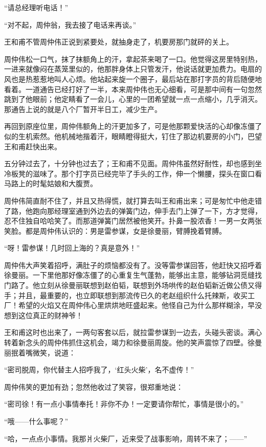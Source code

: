 \par “请总经理听电话！”
\par “对不起，周仲翁，我去接了电话来再谈。”
\par 王和甫不管周仲伟正说到紧要处，就抽身走了，机要房那门就砰的关上。
\par 周仲伟松一口气，抹了抹额角上的汗，拿起茶来喝了一口。他觉得这房里特别热，一进来就像闷在蒸笼里似的，他那胖身体上只管发汗，他说话就更加费力。电扇的风也是热惹惹地叫人心烦。他站起来旋一个圈子，最后站在那打字员的背后随便地看着。一道通告已经打好了一半，本来周仲伟也无心细看，可是那中间有一句忽然跳到了他眼前；他定睛看了一会儿，心里的一团希望就一点一点缩小，几乎消灭。那通告上说的就是八个厂暂开半日工，减少生产。
\par 再回到原座位里，周仲伟额角上的汗更加多了，可是他那颗爱快活的心却像冻僵了似的生机索然。他机械地揩着汗，眼睛瞪得挺大，钉住了那边机要房的小门，巴望王和甫赶快出来。
\par 五分钟过去了，十分钟也过去了；王和甫不见面。周仲伟虽然好耐性，却也感到坐冷板凳的滋味了。那个打字员已经完毕了手头的工作，伸一个懒腰，探头在窗口看马路上的时髦姑娘和大腹贾。
\par 周仲伟简直耐不住了，并且又热得慌，就打算去叫王和甫出来；可是匆忙中他走错了路，他跑向那经理室通到外边去的弹簧门边，伸手去门上弹了一下，方才觉得，忍不住独自哈哈笑了。而那道弹簧门居然被他笑开。扑鼻一股浓香！一男一女两张笑脸。都是周仲伟认识的：男是雷参谋，女是徐曼丽，臂膊挽着臂膊。
\par “呀！雷参谋！几时回上海的？真是意外！”
\par 周仲伟大声笑着招呼，满肚子的烦恼都没有了。没等雷参谋回答，他赶快又招呼着徐曼丽。一下里他那好像冻僵了的心重复生气蓬勃，能够出主意，能够钻洞觅缝找门路了。他立刻从徐曼丽联想到赵伯韬，联想到外场哄传的赵伯韬新近做公债又得手；并且，最重要的，也立即联想到那流传已久的老赵组织什么托辣斯，收买工厂！希望的火焰又在周仲伟心里烘烘地旺盛起来。他怪自己为什么那样糊涂，早没想到这位真正的财神爷！
\par 王和甫这时也出来了，一两句客套以后，就拉雷参谋到一边去，头碰头密谈。满心转着新念头的周仲伟抓住这机会，竭力和徐曼丽周旋。他的笑声震惊了四壁。徐曼丽抿着嘴微笑，说道：
\par “密司脱周，你代替主人招呼我了，‘红头火柴’，名不虚传！”
\par 周仲伟笑的更加有劲；忽然他收过了笑容，很郑重地说：
\par “密司徐！有一点小事情奉托！非你不办！一定要请你帮忙，事情是很小的。”
\par “哦——什么事呢？”
\par “哈，一点点小事情。我那爿火柴厂，近来受了战事影响，周转不来了；——”
